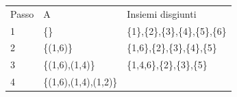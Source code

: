 \documentclass{article}
\begin{document}
\begin{longtable}[]{@{}lll@{}}
\toprule
\begin{minipage}[t]{0.30\columnwidth}\raggedright\strut
{Passo}\strut
\end{minipage} & \begin{minipage}[t]{0.30\columnwidth}\raggedright\strut
{A}\strut
\end{minipage} & \begin{minipage}[t]{0.30\columnwidth}\raggedright\strut
{Insiemi disgiunti}\strut
\end{minipage}\tabularnewline
\begin{minipage}[t]{0.30\columnwidth}\raggedright\strut
{1}\strut
\end{minipage} & \begin{minipage}[t]{0.30\columnwidth}\raggedright\strut
{\{\}}\strut
\end{minipage} & \begin{minipage}[t]{0.30\columnwidth}\raggedright\strut
{\{1\},\{2\},\{3\},\{4\},\{5\},\{6\}}\strut
\end{minipage}\tabularnewline
\begin{minipage}[t]{0.30\columnwidth}\raggedright\strut
{2}\strut
\end{minipage} & \begin{minipage}[t]{0.30\columnwidth}\raggedright\strut
{\{(1,6)\}}\strut
\end{minipage} & \begin{minipage}[t]{0.30\columnwidth}\raggedright\strut
{\{1,6\},\{2\},\{3\},\{4\},\{5\}}\strut
\end{minipage}\tabularnewline
\begin{minipage}[t]{0.30\columnwidth}\raggedright\strut
{3}\strut
\end{minipage} & \begin{minipage}[t]{0.30\columnwidth}\raggedright\strut
{\{(1,6),(1,4)\}}\strut
\end{minipage} & \begin{minipage}[t]{0.30\columnwidth}\raggedright\strut
{\{1,4,6\},\{2\},\{3\},\{5\}}\strut
\end{minipage}\tabularnewline
\begin{minipage}[t]{0.30\columnwidth}\raggedright\strut
{4}\strut
\end{minipage} & \begin{minipage}[t]{0.30\columnwidth}\raggedright\strut
{\{(1,6),(1,4),(1,2)\}}\strut
\end{minipage} & \begin{minipage}[t]{0.30\columnwidth}\raggedright\strut

\end{minipage}
\end{longtable}
\end{document}
